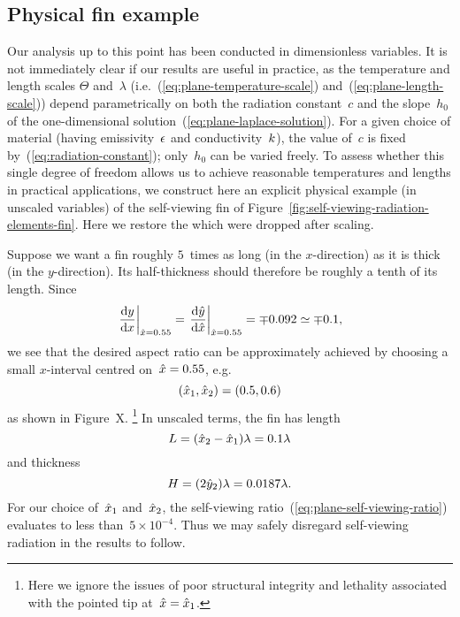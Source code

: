 \begin{figure}
\end{figure}

\subsection{Physical fin example}
\label{sec:cartesian.plane.fin}

Our analysis up to this point
has been conducted in dimensionless variables.
It is not immediately clear if our results are useful in practice,
as the temperature and length scales $\Theta$ and~$\lambda$
(i.e.~(\ref{eq:plane-temperature-scale}) and~(\ref{eq:plane-length-scale}))
depend parametrically
on both the radiation constant~$c$
and the slope~$h_0$
of the one-dimensional solution~(\ref{eq:plane-laplace-solution}).
For a given choice of material
(having emissivity~$\epsilon$ and conductivity~$k$),
the value of~$c$ is fixed by~(\ref{eq:radiation-constant});
only~$h_0$ can be varied freely.
To assess whether this single degree of freedom allows us to achieve
reasonable temperatures and lengths in practical applications,
we construct here an explicit physical example (in unscaled variables)
of the self-viewing fin
of Figure~\ref{fig:self-viewing-radiation-elements-fin}.
Here we restore the \scalingmarks{} which were dropped after scaling.

Suppose we want a fin
roughly $5$~times as long (in the $x$-direction)
as it is thick (in the $y$-direction).
Its half-thickness should therefore be roughly a tenth of its length.
Since
\[
  \eval*{\tder{y}{x}}_{\scaled{x}=0.55}
    = \eval*{\tder{\scaled{y}}{\scaled{x}}}_{\scaled{x}=0.55}
    = \mp 0.092
    \approx \mp 0.1,
\]
we see that the desired aspect ratio can be approximately achieved
by choosing a small $x$-interval centred on~$\hat{x}=0.55$,
e.g.
\begin{equation}
  (\hat{x}_1, \hat{x}_2) = (0.5, 0.6)
  \label{eq:plane-fin-interval}
\end{equation}
as shown in Figure~X\@.%
\footnote{
  Here we ignore the issues of poor structural integrity and lethality
  associated with the pointed tip at~$\hat{x} = \hat{x}_1$.
}
In unscaled terms, the fin has length
\begin{equation}
  L = (\hat{x}_2 - \hat{x}_1) \lambda = 0.1 \lambda
  \label{eq:plane-fin-length}
\end{equation}
and thickness
\begin{equation}
  H = (2 \hat{y}_2) \lambda = 0.0187 \lambda.
  \label{eq:plane-fin-thickness}
\end{equation}
For our choice of~$\hat{x}_1$ and~$\hat{x}_2$,
the self-viewing ratio~(\ref{eq:plane-self-viewing-ratio})
evaluates to less than~$5 \times 10^{-4}$.
Thus we may safely disregard self-viewing radiation
in the results to follow.

